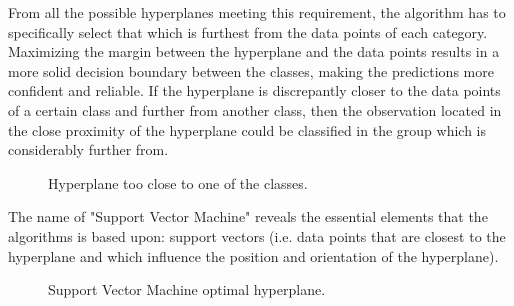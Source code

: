 From all the possible hyperplanes meeting this requirement, the algorithm has to specifically select that which is furthest from the data points of each category. Maximizing the margin between the hyperplane and the data points results in a more solid decision boundary between the classes, making the predictions more confident and reliable. If the hyperplane is discrepantly closer to the data points of a certain class and further from another class, then the observation located in the close proximity of the hyperplane could be classified in the group which is considerably further from.

\begin{figure}[H]
  \centering
  \caption{Hyperplane too close to one of the classes.}
\end{figure}

The name of "Support Vector Machine" reveals the essential elements that the algorithms is based upon: support vectors (i.e. data points that are closest to the hyperplane and which influence the position and orientation of the hyperplane).

\begin{figure}[H]
  \centering
  \caption{Support Vector Machine optimal hyperplane.}
\end{figure}

